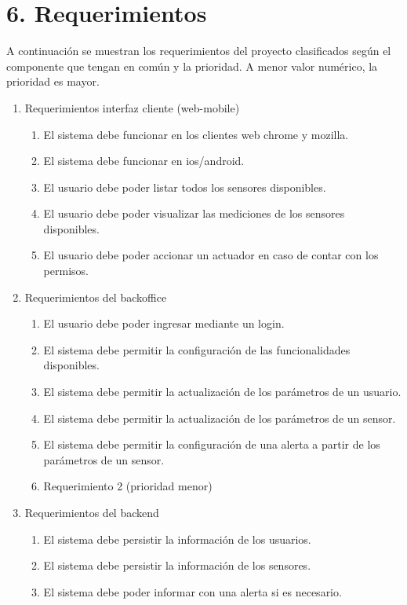 \documentclass[
11pt, %
]{charter}
\begin{document}
\section{6. Requerimientos}
\label{sec:requerimientos}

A continuación se muestran los requerimientos del proyecto clasificados según el componente que tengan en común y la prioridad.
A menor valor numérico, la prioridad es mayor.

\begin{enumerate}
	\item Requerimientos interfaz cliente (web-mobile)
		\begin{enumerate}
			\item El sistema debe funcionar en los clientes web chrome y mozilla.
			\item El sistema debe funcionar en ios/android. 
			\item El usuario debe poder listar todos los sensores disponibles.
			\item El usuario debe poder visualizar las mediciones de los sensores disponibles.
			\item El usuario debe poder accionar un actuador en caso de contar con los permisos.
		\end{enumerate}
	\item Requerimientos del backoffice
		\begin{enumerate}
			\item El usuario debe poder ingresar mediante un login.
			\item El sistema debe permitir la configuración de las funcionalidades disponibles.
			\item El sistema debe permitir la actualización de los parámetros de un usuario.
			\item El sistema debe permitir la actualización de los parámetros de un sensor.
			\item El sistema debe permitir la configuración de una alerta a partir de los parámetros de un sensor.
			\item Requerimiento 2 (prioridad menor)
		\end{enumerate}
	\item Requerimientos del backend
		\begin{enumerate}
			\item El sistema debe persistir la información de los usuarios.
			\item El sistema debe persistir la información de los sensores.
			\item El sistema debe poder informar con una alerta si es necesario.

\end{enumerate}
\end{enumerate}
\end{document}
